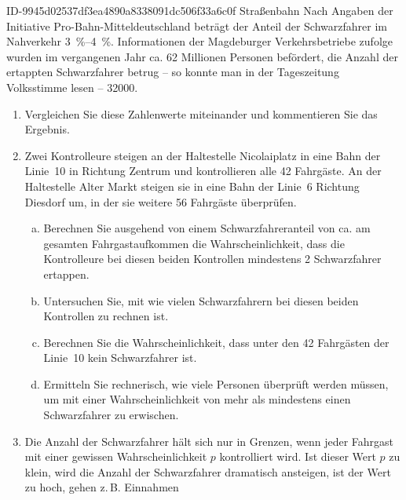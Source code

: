 \begin{exercise}
      {ID-9945d02537df3ea4890a8338091dc506f33a6c0f}
      {Straßenbahn}
  \ifproblem\problem
    Nach Angaben der Initiative \glqq Pro-Bahn-Mitteldeutsch\-land\grqq{} beträgt
    der Anteil der Schwarzfahrer im Nahverkehr \SIrange{3}{4}{\percent}.
    Informationen der Magdeburger Verkehrsbetriebe zufolge wurden im
    vergangenen Jahr ca. 62 Millionen Personen befördert, die Anzahl der
    ertappten Schwarzfahrer betrug -- so konnte man in der Tageszeitung
    \glqq Volksstimme\grqq{} lesen -- \num{32000}.
    \begin{enumerate}[1)]
      \item Vergleichen Sie diese Zahlenwerte miteinander und
            kommentieren Sie das Ergebnis.
      \item Zwei Kontrolleure steigen an der Haltestelle \glqq Nicolaiplatz\grqq{}
            in eine Bahn der Linie~10 in Richtung Zentrum und kontrollieren
            alle 42 Fahrgäste. An der Haltestelle \glqq Alter Markt\grqq{} steigen
            sie in eine Bahn der Linie~6 Richtung Diesdorf um, in der sie weitere
            56 Fahrgäste überprüfen.
            \begin{enumerate}[a)]
              \item Berechnen Sie ausgehend von einem Schwarzfahreranteil von ca.
                     am gesamten Fahrgastaufkommen die Wahrscheinlichkeit,
                    dass die Kontrolleure bei diesen beiden Kontrollen mindestens
                    2 Schwarzfahrer ertappen.
              \item Untersuchen Sie, mit wie vielen Schwarzfahrern bei diesen
                    beiden Kontrollen zu rechnen ist.
              \item Berechnen Sie die Wahrscheinlichkeit, dass unter den 42
                    Fahrgästen der Linie~10 kein Schwarzfahrer ist.
              \item Ermitteln Sie rechnerisch, wie viele Personen überprüft
                    werden müssen, um mit einer Wahrscheinlichkeit von mehr als
                     mindestens einen Schwarzfahrer zu erwischen.
            \end{enumerate}
      \item Die Anzahl der Schwarzfahrer hält sich nur in Grenzen, wenn jeder
            Fahrgast mit einer gewissen Wahrscheinlichkeit $p$ kontrolliert wird.
            Ist dieser Wert $p$ zu klein, wird die Anzahl der Schwarzfahrer
            dramatisch ansteigen, ist der Wert zu hoch, gehen z.\,B. Einnahmen

\end{enumerate}
\end{exercise}

